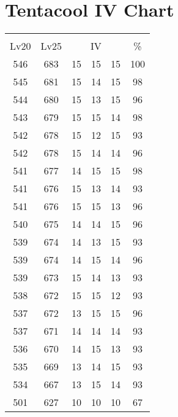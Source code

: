 \documentclass{article}%
\begin{document}
%
\normalsize%
\section{Tentacool IV Chart}%
\label{sec:Tentacool IV Chart}%
\renewcommand{\arraystretch}{1.5}%
\begin{tabular}{|c|c|c|c|c|c|}%
\hline%
\multicolumn{6}{|c|}{\textcolor{white}{ 
\linebreak{Tentacool}
}%
\cellcolor{black}}\\%
\multicolumn{1}{|c}{Lv20}&\multicolumn{1}{c|}{Lv25}&\multicolumn{3}{c|}{IV}&\multicolumn{1}{|c|}{\%}\\%
\hline%
\rowcolor{color100}%
546&683&15&15&15&100\\%
\hline%
\rowcolor{color98}%
545&681&15&14&15&98\\%
\hline%
\rowcolor{color96}%
544&680&15&13&15&96\\%
\hline%
\rowcolor{color98}%
543&679&15&15&14&98\\%
\hline%
\rowcolor{color93}%
542&678&15&12&15&93\\%
\hline%
\rowcolor{color96}%
542&678&15&14&14&96\\%
\hline%
\rowcolor{color98}%
541&677&14&15&15&98\\%
\hline%
\rowcolor{color93}%
541&676&15&13&14&93\\%
\hline%
\rowcolor{color96}%
541&676&15&15&13&96\\%
\hline%
\rowcolor{color96}%
540&675&14&14&15&96\\%
\hline%
\rowcolor{color93}%
539&674&14&13&15&93\\%
\hline%
\rowcolor{color96}%
539&674&14&15&14&96\\%
\hline%
\rowcolor{color93}%
539&673&15&14&13&93\\%
\hline%
\rowcolor{color93}%
538&672&15&15&12&93\\%
\hline%
\rowcolor{color96}%
537&672&13&15&15&96\\%
\hline%
\rowcolor{color93}%
537&671&14&14&14&93\\%
\hline%
\rowcolor{color93}%
536&670&14&15&13&93\\%
\hline%
\rowcolor{color93}%
535&669&13&14&15&93\\%
\hline%
\rowcolor{color93}%
534&667&13&15&14&93\\%
\hline%
\rowcolor{color91}%
501&627&10&10&10&67\\%
\end{tabular}

%
\end{document}
